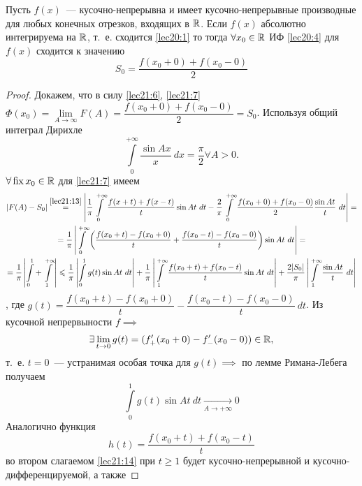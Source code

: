 \documentclass[../../main.tex]{subfiles}
\begin{document}
\begin{thm}[о сходимости ИФ]
	Пусть $ f(x) $~--- кусочно-непрерывна и имеет кусочно-непрерывные
	производные для любых конечных отрезков, входящих в $ \mathbb{R} $.
	Если $ f(x) $ абсолютно интегрируема на $ \mathbb{R} $, т.~е.
	сходится \eqref{lec20:1} то тогда 
	$ \forall x_0 \in \mathbb{R} $ ИФ \eqref{lec20:4} для $ f(x) $ сходится
	к значению 
	\begin{equation}
	\label{lec21:13}
	S_0 = \dfrac{f(x_0 + 0) + f(x_0 - 0)}{2}
	\end{equation}
\end{thm}
\begin{proof}
	Докажем, что в силу \eqref{lec21:6}, \eqref{lec21:7}
	$ \Phi(x_0) = \lim\limits_{A \to \infty} F(A) = 
	\dfrac{f(x_0 + 0) + f(x_0 - 0)}{2} = S_0 $.
	Используя общий интеграл Дирихле 
	\[
	\int\limits_{0}^{+\infty} \dfrac{\sin Ax}{x}\ dx = \dfrac{\pi}{2} \forall A > 
	0.
	\]
	$ \forall \operatorname{fix} x_0 \in \mathbb{R} $ для \eqref{lec21:7} имеем
	\begin{equation}
	\label{lec21:14}
	\begin{gathered}
	|F(A) - S_0| \stackrel{\eqref{lec21:13}}{=}
	\left|
	\dfrac{1}{\pi}
	\int\limits_{0}^{+\infty}
	\dfrac{f(x + t) + f(x - t)}{t} \sin At\ dt - 
	\dfrac{2}{\pi} \int\limits_{0}^{+\infty} 
	\dfrac{f(x_0 + 0) + f(x_0 - 0)}{2} \dfrac{\sin At}{t}\ dt
	\right| = \\ =
	\dfrac{1}{\pi} \left|
	\int\limits_{0}^{+\infty} \left(
	\dfrac{f(x_0 + t) - f(x_0 + 0)}{t} +
	\dfrac{f(x_0 - t) - f(x_0 - 0) }{t}
	\right)
	\sin At\ dt
	\right| = \\ = \dfrac{1}{\pi}
	\left|
	\int\limits_{0}^{1} + \int\limits_{1}^{+\infty}
	\right| \leqslant \dfrac{1}{\pi}
	\left|
	\int\limits_{0}^{1} g(t) \sin At\ dt
	\right| + \dfrac{1}{\pi}
	\left|
	\int\limits_{1}^{+\infty} 
	\dfrac{f(x_0 + t) + f(x_0 - t)}{t} \sin At\ dt
	\right| + \dfrac{2|S_0|}{\pi}
	\left|
	\int\limits_{1}^{+\infty} \dfrac{\sin At}{t}\ dt
	\right|
	\end{gathered}
	\end{equation}, где $ g(t) = \dfrac{f(x_0 + t) - f(x_0 + 0)}{t} - 
	\dfrac{f(x_0 - t) - f(x_0 - 0)}{t}\ dt $.
	Из кусочной непрервыности $ f \implies $
	\[
	\exists \lim\limits_{t \to 0} g(t) =
	(f_+'(x_0 + 0) - f_-'(x_0 - 0)) \in \mathbb{R},
	\] т.~е. $ t = 0 $~--- устранимая особая точка для $ g(t) \implies $
	по лемме Римана-Лебега получаем
	\[
	\int\limits_{0}^{1} g(t) \sin At\ dt
	\underset{A \to +\infty}{\to} 0
	\]
	Аналогично функция \[
	h(t) = \dfrac{f(x_0 + t) + f(x_0 - t)}{t}
	\] во втором слагаемом \eqref{lec21:14} при 
	$ t \geq 1 $ будет кусочно-непрерывной и кусочно-дифференцируемой, а также

\end{proof}
\end{document}
